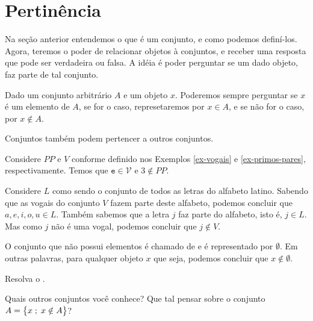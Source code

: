 \section{Pertinência}

Na seção anterior entendemos o que é um conjunto, e como podemos definí-los.
Agora, teremos o poder de relacionar objetos à conjuntos, e receber uma resposta que pode ser verdadeira ou falsa.
A idéia é poder perguntar se um dado objeto, faz parte de tal conjunto.

\begin{definition}
\label{def:in}
Dado um conjunto arbitrário $A$ e um objeto $x$.
Poderemos sempre perguntar se $x$ é um elemento de $A$, se for o caso, represetaremos por $x \in A$, e se não for o caso, por $x \notin A$.
\end{definition}

\begin{remark}
Conjuntos também podem pertencer a outros conjuntos.
\end{remark}

\begin{example}
Considere $PP$ e $V$ conforme definido nos Exemplos \ref{ex-vogais} e \ref{ex-primos-pares}, respectivamente. Temos que $\texttt{e} \in \mathcal{V}$ e $3 \notin PP$.
\end{example}

\begin{example}
Considere $L$ como sendo o conjunto de todos as letras do alfabeto latino.
Sabendo que as vogais do conjunto $V$ fazem parte deste alfabeto, podemos concluir que $a, e, i, o, u \in L$.
Também sabemos que a letra $j$ faz parte do alfabeto, isto é, $j \in L$.
Mas como $j$ não é uma vogal, podemos concluir que $j \notin V$.

\end{example}

\begin{definition}
\label{def:emptyset}
O conjunto que não possui elementos é chamado de  e é representado por $\emptyset$.
Em outras palavras, para qualquer objeto $x$ que seja, podemos concluir que $x \notin \emptyset$.
\end{definition}

\begin{homework}
Resolva o .
\end{homework}

\begin{example}
Quais outros conjuntos você conhece? Que tal pensar sobre o conjunto $A = \left\{ x \;;\; x \notin A\right\}$?
\end{example}

